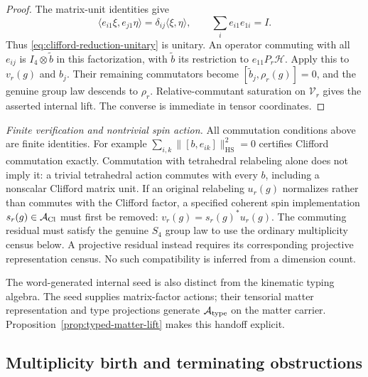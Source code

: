 \documentclass[11pt]{article}
\numberwithin{equation}{section}
\theoremstyle{definition}
\theoremstyle{remark}
\newcommand{\HS}{\mathrm{HS}}
\newcommand{\norm}[1]{\lVert#1\rVert}
\newcommand{\A}{\mathcal A}
\newcommand{\Hh}{\mathcal H}
\begin{document}
\begin{proof}
The matrix-unit identities give
\[
 \langle e_{i1}\xi,e_{j1}\eta\rangle
 =\delta_{ij}\langle\xi,\eta\rangle,\qquad
 \sum_i e_{i1}e_{1i}=I.
\]
Thus \eqref{eq:clifford-reduction-unitary} is unitary.  An operator commuting
with all $e_{ij}$ is $I_4\otimes\widetilde b$ in this factorization, with
$\widetilde b$ its restriction to $e_{11}P_r\Hh$.  Apply this to $v_r(g)$
and $b_j$.  Their remaining commutators become
$[\widetilde b_j,\rho_r(g)]=0$, and the genuine group law descends to
$\rho_r$.  Relative-commutant saturation on $\mathcal V_r$ gives the
asserted internal lift.  The converse is immediate in tensor coordinates.
\end{proof}

\noindent\textit{Finite verification and nontrivial spin action.} All commutation conditions above are finite identities.  For example
$\sum_{i,k}\norm{[b,e_{ik}]}_{\HS}^2=0$ certifies Clifford commutation
exactly.  Commutation with tetrahedral relabeling alone does not imply it:
a trivial tetrahedral action commutes with every $b$, including a nonscalar
Clifford matrix unit.  If an original relabeling $u_r(g)$ normalizes rather
than commutes with the Clifford factor, a specified coherent spin
implementation $s_r(g)\in\A_{\rm Cl}$ must first be removed:
$v_r(g)=s_r(g)^*u_r(g)$.  The commuting residual must satisfy the genuine
$S_4$ group law to use the ordinary multiplicity census below.  A projective
residual instead requires its corresponding projective representation
census.  No such compatibility is inferred from a dimension count.


The word-generated internal seed is also distinct from the kinematic typing
algebra.  The seed supplies matrix-factor actions; their tensorial matter
representation and type projections generate $\A_{\rm type}$ on the matter
carrier.  Proposition~\ref{prop:typed-matter-lift} makes this handoff explicit.


\subsection{Multiplicity birth and terminating obstructions}
\label{sec:multiplicity-birth}
\end{document}
